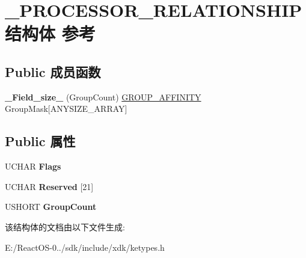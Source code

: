 \hypertarget{struct___p_r_o_c_e_s_s_o_r___r_e_l_a_t_i_o_n_s_h_i_p}{}\section{\+\_\+\+P\+R\+O\+C\+E\+S\+S\+O\+R\+\_\+\+R\+E\+L\+A\+T\+I\+O\+N\+S\+H\+I\+P结构体 参考}
\label{struct___p_r_o_c_e_s_s_o_r___r_e_l_a_t_i_o_n_s_h_i_p}
\subsection*{Public 成员函数}
\begin{DoxyCompactItemize}
\item 
\mbox{\label{struct___p_r_o_c_e_s_s_o_r___r_e_l_a_t_i_o_n_s_h_i_p_ad85431528147b8e95efc2b3e9f56e43c}} 
{\bfseries \+\_\+\+Field\+\_\+size\+\_\+} (Group\+Count) \hyperlink{struct___g_r_o_u_p___a_f_f_i_n_i_t_y}{G\+R\+O\+U\+P\+\_\+\+A\+F\+F\+I\+N\+I\+TY} Group\+Mask\mbox{[}A\+N\+Y\+S\+I\+Z\+E\+\_\+\+A\+R\+R\+AY\mbox{]}
\end{DoxyCompactItemize}
\subsection*{Public 属性}
\begin{DoxyCompactItemize}
\item 
\mbox{\label{struct___p_r_o_c_e_s_s_o_r___r_e_l_a_t_i_o_n_s_h_i_p_ab13f2bbc3f62f6d55ddd3a697eabfcf4}} 
U\+C\+H\+AR {\bfseries Flags}
\item 
\mbox{\label{struct___p_r_o_c_e_s_s_o_r___r_e_l_a_t_i_o_n_s_h_i_p_a04e8938ab3eb50e2745914afe920dcec}} 
U\+C\+H\+AR {\bfseries Reserved} \mbox{[}21\mbox{]}
\item 
\mbox{\label{struct___p_r_o_c_e_s_s_o_r___r_e_l_a_t_i_o_n_s_h_i_p_a4af7c55bc995b0b1375e648d845aafb8}} 
U\+S\+H\+O\+RT {\bfseries Group\+Count}
\end{DoxyCompactItemize}


该结构体的文档由以下文件生成\+:\begin{DoxyCompactItemize}
\item 
E\+:/\+React\+O\+S-\/0../sdk/include/xdk/ketypes.\+h\end{DoxyCompactItemize}
